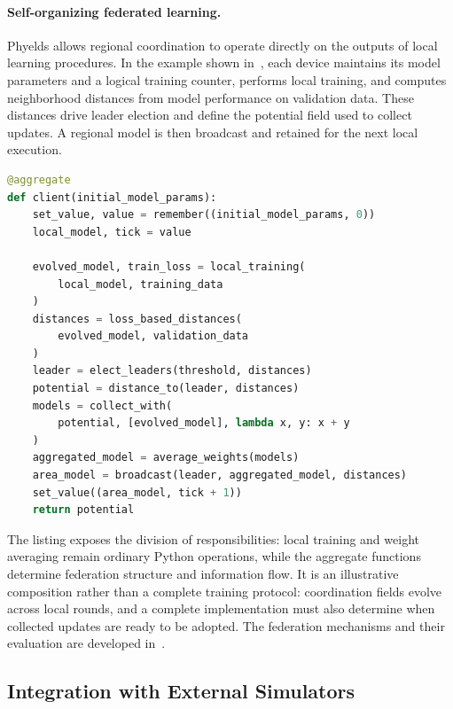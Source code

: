 \paragraph{Self-organizing federated learning.}
Phyelds allows regional coordination to operate directly on the outputs of
 local learning procedures.
%
In the example shown in~, each device maintains
 its model parameters and a logical training counter, performs local
 training, and computes neighborhood distances from model performance
 on validation data.
%
These distances drive leader election and define the potential field used
 to collect updates.
%
A regional model is then broadcast and retained for the next local execution.

\begin{lstlisting}[language=Python,breaklines=true,
  caption={Illustrative coordination of self-organizing federated learning.
   Training, loss-based distances, and weight averaging are application helpers.},
  label={lst:phyelds-sofl}]
@aggregate
def client(initial_model_params):
    set_value, value = remember((initial_model_params, 0))
    local_model, tick = value

    evolved_model, train_loss = local_training(
        local_model, training_data
    )
    distances = loss_based_distances(
        evolved_model, validation_data
    )
    leader = elect_leaders(threshold, distances)
    potential = distance_to(leader, distances)
    models = collect_with(
        potential, [evolved_model], lambda x, y: x + y
    )
    aggregated_model = average_weights(models)
    area_model = broadcast(leader, aggregated_model, distances)
    set_value((area_model, tick + 1))
    return potential
\end{lstlisting}

The listing exposes the division of responsibilities: local training and
 weight averaging remain ordinary Python operations, while the aggregate
 functions determine federation structure and information flow.
%
It is an illustrative composition rather than a complete training protocol:
 coordination fields evolve across local rounds, and a complete implementation
 must also determine when collected updates are ready to be adopted.
%
The federation mechanisms and their evaluation are developed
 in~.

\subsection{Integration with External Simulators}
\label{sec:phyelds-external-simulators}

